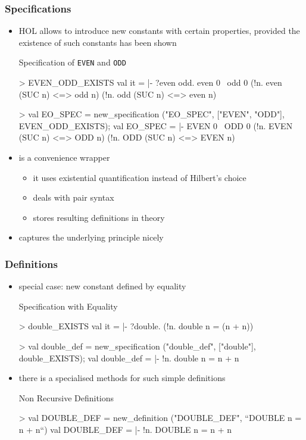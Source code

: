 \begin{frame}[fragile]
\frametitle{Specifications}
\begin{itemize}
\item HOL allows to introduce new constants with certain properties, provided the
  existence of such constants has been shown
\begin{exampleblock}{Specification of \texttt{EVEN} and \texttt{ODD}}
\begin{semiverbatim}\scriptsize
> EVEN\_ODD\_EXISTS
val it = |- ?even odd. even 0 \holAnd{} ~odd 0 \holAnd{} (!n. even (SUC n) <=> odd n) \holAnd{} 
                       (!n. odd (SUC n) <=> even n)

> val EO\_SPEC = new\_specification ("EO\_SPEC", ["EVEN", "ODD"], EVEN\_ODD\_EXISTS);
val EO\_SPEC = |- EVEN 0 \holAnd{} ~ODD 0 \holAnd{} (!n. EVEN (SUC n) <=> ODD n) \holAnd{}
                 (!n. ODD (SUC n) <=> EVEN n)
\end{semiverbatim}
\end{exampleblock}
\item {} is a convenience wrapper 
\begin{itemize}
\item it uses existential quantification instead of Hilbert's choice
\item deals with pair syntax
\item stores resulting definitions in theory
\end{itemize}
\item {} captures the underlying principle nicely
\end{itemize}
\end{frame}


\begin{frame}[fragile]
\frametitle{Definitions}
\begin{itemize}
\item special case: new constant defined by equality
\begin{exampleblock}{Specification with Equality}
\begin{semiverbatim}\scriptsize
> double_EXISTS
val it =
|- ?double. (!n. double n = (n + n))

> val double_def = new_specification ("double_def", ["double"], double_EXISTS);
val double_def =
   |- !n. double n = n + n
\end{semiverbatim}
\end{exampleblock}
\item there is a specialised methods for such simple definitions 
\begin{exampleblock}{Non Recursive Definitions}
\begin{semiverbatim}\scriptsize
> val DOUBLE_DEF = new_definition ("DOUBLE_DEF", ``DOUBLE n = n + n``)
val DOUBLE_DEF =
   |- !n. DOUBLE n = n + n
\end{semiverbatim}
\end{exampleblock}
\end{itemize}
\end{frame}


